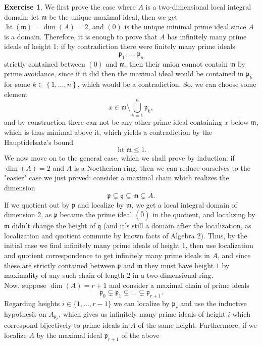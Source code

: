 \documentclass[a4paper]{article}
\theoremstyle{definition}
\theoremstyle{definition}
\theoremstyle{remark}
\theoremstyle{definition}
\newtheorem{exercise}{Exercise}[section]
\begin{document}
\begin{exercise}
	We first prove the case where $A$ is a two-dimensional local integral domain: let $\mathfrak{m}$ be the unique maximal ideal, then we get
	$\operatorname{ht}(\mathfrak{m})=\operatorname{dim}(A)=2$, and
	$(0)$ is the unique minimal prime ideal since $A$ is a domain. Therefore, it is enough to prove that $A$ has infinitely many prime ideals of height 1: if by
	contradiction there were finitely many prime ideals $$\mathfrak{p}_1,\dots,\mathfrak{p}_n$$
	strictly contained between $(0)$ and $\mathfrak{m}$, then their union cannot contain  $\mathfrak{m}$ by prime avoidance, since if it did then the maximal ideal would be
	contained in $\mathfrak{p}_k$ for some $k\in\left\{ 1,\dots,n \right\} $, which would be a contradiction. So, we can choose some element
	$$x\in\mathfrak{m}\setminus\bigcup_{k=1}^n{\mathfrak{p}_k},$$ and by construction there can not be any other prime ideal containing $x$ below $\mathfrak{m}$, which is thus
	minimal above it, which yields a contradiction by the Hauptidelsatz's bound $$\operatorname{ht}{\mathfrak{m}}\leq 1.$$
	We now move on to the general case, which we shall prove by induction: if $\operatorname{dim}{(A)}=2$ and $A$ is a Noetherian ring, then we can reduce ourselves to the
	"easier" case we just proved: consider a maximal chain which realizes the dimension $$ \mathfrak{p}\subsetneq\mathfrak{q}\subsetneq\mathfrak{m}\subsetneq A.$$ If we
	quotient out by $\mathfrak{p}$ and localize by $\mathfrak{m}$, we get a local integral domain of dimension 2, as $\mathfrak{p}$ became the prime ideal $(\bar{0})$ in the
	quotient, and localizing by $\mathfrak{m}$ didn't change the height of $\bar{\mathfrak{q}}$ (and it's still a domain after the localization, as localization and quotient commute by known facts of Algebra 2).
	Thus, by the initial case we find infinitely many prime ideals of height 1, then use localization and quotient correspondence to get infinitely many prime ideals in $A$,
	and since these are strictly contained between $\mathfrak{p}$ and $\mathfrak{m}$ they must have height $1$ by maximality of any such chain of length 2 in a two-dimensional
	ring.\\
	Now, suppose $\operatorname{dim}(A)=r+1$ and consider a maximal chain of prime ideals $$ \mathfrak{p}_0\subsetneq\mathfrak{p}_1\subsetneq\dots\subsetneq\mathfrak{p}_{r+1}
	.$$ Regarding
	heights $i\in\{1,\dots, r-1\}$ we can localize by $\mathfrak{p}_r$ and use the inductive hypothesis on $A_{\mathfrak{p}_r}$, which gives us infinitely
	many prime ideals of height $i$ which correspond bijectively to prime ideals in $A$ of the same height. Furthermore, if we localize $A$ by the maximal ideal $\mathfrak{p}_{r+1}$ of the above

\end{exercise}
\end{document}

